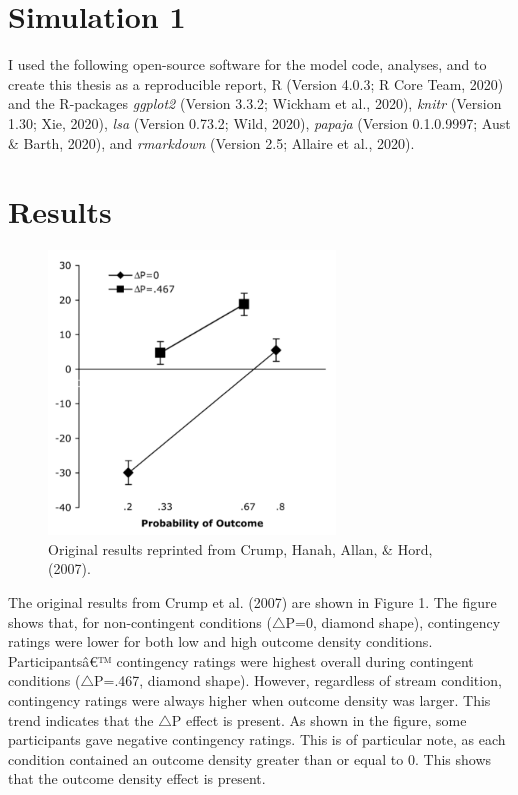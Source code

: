 \documentclass[
  english,
  man,floatsintext]{apa6}
\begin{document}
\hypertarget{simulation-1}{%
\section{Simulation 1}\label{simulation-1}}

I used the following open-source software for the model code, analyses, and to create this thesis as a reproducible report, R (Version 4.0.3; R Core Team, 2020) and the R-packages \emph{ggplot2} (Version 3.3.2; Wickham et al., 2020), \emph{knitr} (Version 1.30; Xie, 2020), \emph{lsa} (Version 0.73.2; Wild, 2020), \emph{papaja} (Version 0.1.0.9997; Aust \& Barth, 2020), and \emph{rmarkdown} (Version 2.5; Allaire et al., 2020).

\hypertarget{results}{%
\section{Results}\label{results}}

\begin{figure}

{\centering \includegraphics[width=3in]{imgs/crump_results} 

}

\caption{Original results reprinted from Crump, Hanah, Allan, \& Hord, (2007).}\label{fig:unnamed-chunk-4}
\end{figure}

The original results from Crump et al. (2007) are shown in Figure 1. The figure shows that, for non-contingent conditions (\(\triangle\)P=0, diamond shape), contingency ratings were lower for both low and high outcome density conditions. Participantsâ€™ contingency ratings were highest overall during contingent conditions (\(\triangle\)P=.467, diamond shape). However, regardless of stream condition, contingency ratings were always higher when outcome density was larger. This trend indicates that the \(\triangle\)P effect is present. As shown in the figure, some participants gave negative contingency ratings. This is of particular note, as each condition contained an outcome density greater than or equal to 0. This shows that the outcome density effect is present.
\end{document}

